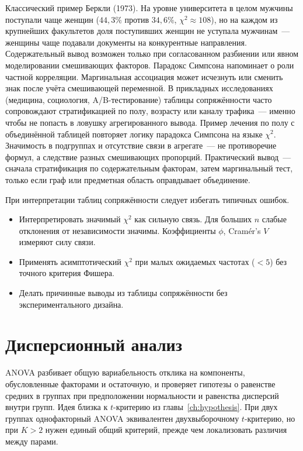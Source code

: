 Классический пример Беркли (1973). На уровне университета в целом мужчины поступали чаще женщин ($44{,}3\%$ против $34{,}6\%$, $\chi^2\approx 108$), но на каждом из крупнейших факультетов доля поступивших женщин не уступала мужчинам~--- женщины чаще подавали документы на конкурентные направления.
Содержательный вывод возможен только при согласованном разбиении или явном моделировании смешивающих факторов.
Парадокс Симпсона напоминает о роли частной корреляции. Маргинальная ассоциация может исчезнуть или сменить знак после учёта смешивающей переменной.
В прикладных исследованиях (медицина, социология, A/B-тестирование) таблицы сопряжённости часто сопровождают стратификацией по полу, возрасту или каналу трафика~--- именно чтобы не попасть в ловушку агрегированного вывода.
Пример лечения по полу с объединённой таблицей повторяет логику парадокса Симпсона на языке $\chi^2$. Значимость в подгруппах и отсутствие связи в агрегате~--- не противоречие формул, а следствие разных смешивающих пропорций.
Практический вывод~--- сначала стратификация по содержательным факторам, затем маргинальный тест, только если граф или предметная область оправдывает объединение.

При интерпретации таблиц сопряжённости следует избегать типичных ошибок.
\begin{itemize}
    \item Интерпретировать значимый $\chi^2$ как сильную связь.
          Для больших $n$ слабые отклонения от независимости значимы. Коэффициенты $\phi$, Cramér's $V$ измеряют силу связи.
    \item Применять асимптотический $\chi^2$ при малых ожидаемых
          частотах ($<5$) без точного критерия Фишера.
    \item Делать причинные выводы из таблицы сопряжённости
          без экспериментального дизайна.
\end{itemize}

\section{Дисперсионный анализ}
\label{sec:anova}

ANOVA разбивает общую вариабельность отклика на компоненты, обусловленные факторами и остаточную, и проверяет гипотезы о равенстве средних в группах при предположении нормальности и равенства дисперсий внутри групп.
Идея близка к $t$-критерию из главы~\ref{ch:hypothesis}. При двух группах однофакторный ANOVA эквивалентен двухвыборочному $t$-критерию, но при $K>2$ нужен единый общий критерий, прежде чем локализовать различия между парами.

